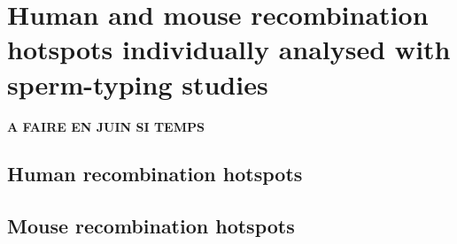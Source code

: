 %

\chapter{\label{app:list-hostpots}Human and mouse recombination hotspots individually analysed with sperm-typing studies}

\minitoc{}

\textbf{A FAIRE EN JUIN SI TEMPS}
\section{Human recombination hotspots}
\section{Mouse recombination hotspots}



